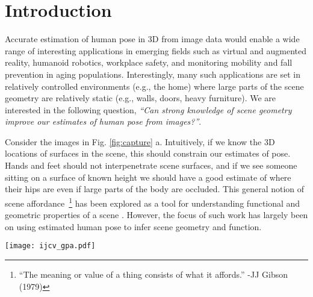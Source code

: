 \documentclass[times,referee,twocolumn,final,authoryear]{elsarticle}
\begin{document}
\section{Introduction}


Accurate estimation of human pose in 3D from image data would enable a wide
range of interesting applications in emerging fields such as virtual and
augmented reality, humanoid robotics, workplace safety, and monitoring mobility and fall
prevention in aging populations. Interestingly, many such applications are set
in relatively controlled environments (e.g., the home) where large parts of the
scene geometry are relatively static (e.g., walls, doors, heavy furniture). We
are interested in the following question, {\em ``Can strong knowledge of scene
geometry improve our estimates of human pose from images?''}. 

Consider the images in Fig. \ref{fig:capture} a. Intuitively, if we know the 3D
locations of surfaces in the scene, this should constrain our estimates of pose.
Hands and feet should not interpenetrate scene surfaces, and if we see someone
sitting on a surface of known height we should have a good estimate of where
their hips are even if large parts of the body are occluded. This general
notion of scene affordance~\footnote {``The meaning or value of a thing consists
of what it affords.'' -JJ Gibson (1979)} has been explored as a tool for
understanding functional and geometric properties of a scene
\citep{Guptaafford,Fouhey12,Wang_affordanceCVPR2017,xueting}.  However, the focus of
such work has largely been on using estimated human pose to infer scene
geometry and function.

\begin{figure*}[t]
\begin{center}
   \texttt{[image: ijcv\_gpa.pdf]}
\end{center}
   \caption{\textbf{a}: Samples from our data set featuring scene constrained poses:
   stepping on the stairs, sitting on the tables and touching boxes. 
   \textbf{b}: Sample frame of a human interacting with scene geometry, and visualization
   of the corresponding 3D scene mesh with captured human pose.
   \textbf{c}: Motion capture setup. We simultaneously captured 3 RGBD and 2 RGB video 
   streams and ground-truth 3D pose from a VICON marker-based mocap system. Cameras
   are calibrated with respect to a 3D mesh model of scene geometry.
   }
\label{fig:capture}
\end{figure*}
\end{document}
